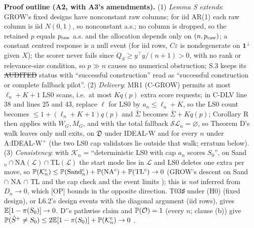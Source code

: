 \textbf{Proof outline (A2, with A3's amendments).} (1) \emph{Lemma S extends}: GROW's fixed designs have nonconstant raw columns; for iid AR(1) each raw column is iid $N(0,1)$, so nonconstant a.s.; no column is dropped, so the retained $p$ equals $p_{\rm raw}$ a.s. and the allocation depends only on $(n,p_{\rm raw})$; a constant centred response is a null event (for iid rows, $C\varepsilon$ is nondegenerate on $\mathbf 1^\perp$ given $X$); the scorer never fails since $Q_S\ge y^\top y/(n+1)>0$, with no rank or relevance-size condition, so $p\gg n$ causes no numerical obstruction; S.3 keeps its \st{AUDITED} status with ``successful construction'' read as ``successful construction or complete fallback pilot''. (2) \emph{Delivery}: MR1 (C-GROW) permits at most $\ell_n+K+1$ LS0 scans, i.e.\ at most $Kq(p)$ extra score requests; in C-DLV  line 38 and  lines 25 and 43, replace $\ell$ for LS0 by $a_n\le\ell_n+K$, so the LS0 count becomes $\le1+(\ell_n+K+1)q(p)$ and $\bar\Sigma$ becomes $\bar\Sigma+Kq(p)$; Corollary R then applies with $W_G,M_G$, and with the total fallback $\mathcal{SL}_n=\varnothing$, so Theorem D's walk leaves only null exits, on $\mathfrak D$ under IDEAL-W and for every $n$ under A:IDEAL-W$^{+}$ (the two LS0 cap validators lie outside that walk; erratum below). (3) \emph{Consistency}: with $\mathcal K_n$ = ``deterministic LS0 with cap $a_n$ scores $S_0$'', on Sand$_n\cap$NA$(\mathcal L)\cap$TL$(\mathcal L)$ the start mode lies in $\mathcal L$ and LS0 deletes one extra per move, so $\mathbb P(\mathcal K_n^c)\le\mathbb P(\mathrm{Sand}_n^c)+\mathbb P(\mathrm{NA}^c)+\mathbb P(\mathrm{TL}^c)\to0$ (GROW's descent on Sand $\cap$ NA $\cap$ TL and the cap check  and the event limits ); this is \emph{not} inferred from $D_n\to0$, which [OP] bounds in the opposite direction. T03♯ under (H0) (fixed design), or L6.2's design events with the diagonal argument (iid rows), gives $\mathbb E[1-\pi(S_0)]\to0$. D′'s pathwise claim and $\mathbb P(\mathcal O)=1$ (every $n$; clause (b)) give $\mathbb P(\hat S^{+}\ne S_0)\le2\mathbb E[1-\pi(S_0)]+\mathbb P(\mathcal K_n^c)\to0$ .
